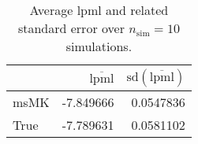 \begin{table}[H]

\caption{Average lpml and related standard error over $n_{\text{sim}} = 10$ simulations.}
\centering
\begin{tabular}[t]{lrr}
\toprule
  & $\overbar{\text{lpml}}$ & $\text{sd}(\overbar{\text{lpml}})$\\
\midrule
msMK & -7.849666 & 0.0547836\\
True & -7.789631 & 0.0581102\\
\bottomrule
\end{tabular}
\end{table}